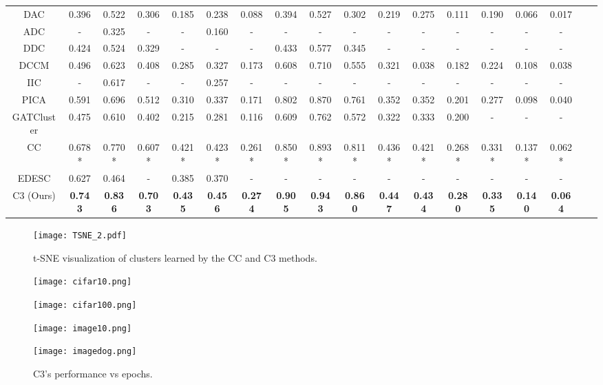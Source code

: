 \documentclass{bmvc2k}
\begin{document}
\begin{table*}[!t]
\begin{center}
{{\begin{tabular}{c|ccc|ccc|ccc|ccc|ccc|cc}
    DAC \cite{dac}&0.396&0.522&0.306&0.185&0.238&0.088&0.394&0.527&0.302&0.219&0.275&0.111&0.190&0.066&0.017\\
    ADC \cite{adc}&-&0.325&-&-&0.160&-&-&-&-&-&-&-&-&-&-\\
    DDC \cite{DDC}&0.424&0.524&0.329&-&-&-&0.433&0.577&0.345&-&-&-&-&-&-\\
    DCCM \cite{DCCM}&0.496&0.623&0.408&0.285&0.327&0.173&0.608&0.710&0.555&0.321&0.038&0.182&0.224&0.108&0.038\\
    IIC \cite{IIC}&-&0.617&-&-&0.257&-&-&-&-&-&-&-&-&-&-\\
    PICA \cite{PICA}&0.591&0.696&0.512&0.310&0.337&0.171&0.802&0.870&0.761&0.352&0.352&0.201&0.277&0.098&0.040\\
    GATCluster \cite{gatcluster2020}&0.475&0.610&0.402&0.215&0.281&0.116&0.609&0.762&0.572&0.322&0.333&0.200&-&-&-\\
    CC \cite{CC} &0.678*&0.770*&0.607*&0.421*&0.423*&0.261*&0.850*&0.893*&0.811*&0.436*&0.421*&0.268*&0.331*&0.137*&0.062*\\
    EDESC \cite{edesc}&0.627&0.464&-&0.385&0.370&-&-&-&-&-&-&-&-&-&-\\
    \hline
    C3 (Ours) &\textbf{0.743}&\textbf{0.836}&\textbf{0.703}&\textbf{0.435}&\textbf{0.456}&\textbf{0.274}&\textbf{0.905}&\textbf{0.943}&\textbf{0.860}&\textbf{0.447}&\textbf{0.434}&\textbf{0.280}&\textbf{0.335}&\textbf{0.140}&\textbf{0.064}\\
\bottomrule
\end{tabular}
}}
\end{center}
\end{table*}

\begin{figure*}[t]
\vspace{-6mm}
  \centering
  \texttt{[image: TSNE\_2.pdf]}
  \caption{t-SNE visualization of clusters learned by the CC and C3 methods.}
  \vspace{-5mm}
  \label{fig:tsne}
\end{figure*}


\begin{wrapfigure}{R}{0.5\textwidth}
\vspace{-4mm}
\begin{minipage}[b]{.48\linewidth}
  \centering
  \centerline{\texttt{[image: cifar10.png]}}
\end{minipage}
\hfill
\begin{minipage}[b]{0.48\linewidth}
  \centering
  \centerline{\texttt{[image: cifar100.png]}}
\end{minipage}
\begin{minipage}[b]{.48\linewidth}
  \centering
  \centerline{\texttt{[image: image10.png]}}
\end{minipage}
\hfill
\begin{minipage}[b]{0.48\linewidth}
  \centering
  \centerline{\texttt{[image: imagedog.png]}}
\end{minipage}
\caption{C3's performance vs epochs.}
\label{fig:convergence}
\end{wrapfigure}
\end{document}
